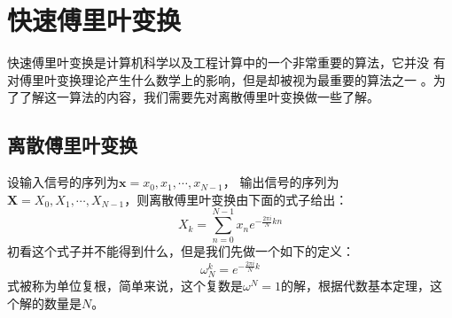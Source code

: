 \chapter{快速傅里叶变换}
    快速傅里叶变换是计算机科学以及工程计算中的一个非常重要的算法，它并没%
    有对傅里叶变换理论产生什么数学上的影响，但是却被视为最重要的算法之一%
    。为了了解这一算法的内容，我们需要先对离散傅里叶变换做一些了解。
    \section{离散傅里叶变换}
        设输入信号的序列为$\textbf{x} = {x_0, x_1, \cdots, x_{N - 1}}$， 输出信号的序列为$\textbf{X} = {X_0, X_1, \cdots, X_{N - 1}}$，则离散傅里叶变换由下面的式子给出：
        \begin{equation}
            X_k = \sum_{n = 0}^{N - 1} x_n e^{-\frac{2\pi i}{N}kn}
            \label{eq: 4.1}
        \end{equation}
        初看这个式子并不能得到什么，但是我们先做一个如下的定义：
        \begin{equation}
            \omega_N^k = e^{-\frac{2\pi i}{N}k}
            \label{eq: 4.2}
        \end{equation}
        式被称为单位复根，简单来说，这个复数是$\omega^N = 1$的解，根据代数基本定理，这个解的数量是$N$。
        